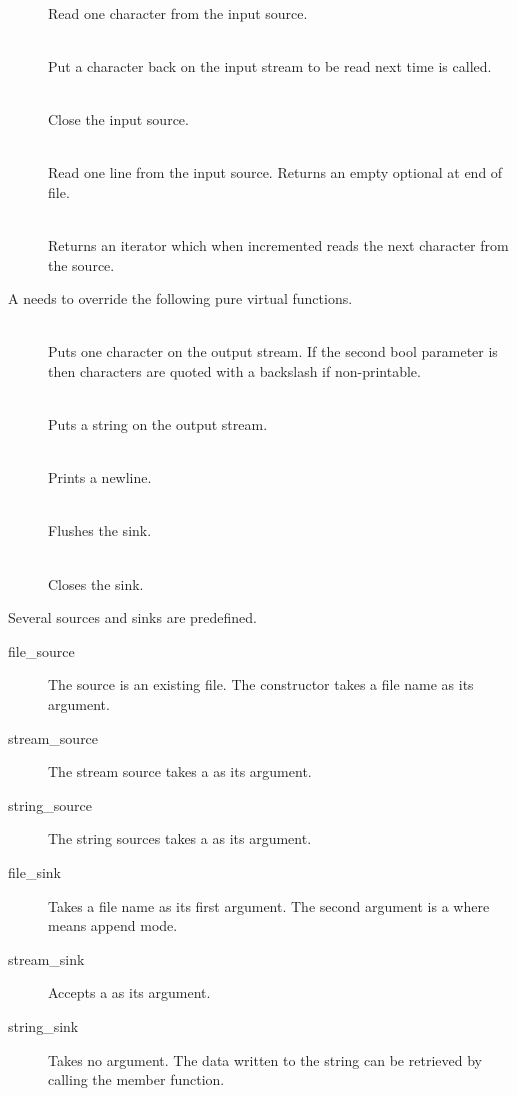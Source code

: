 \begin{description}
  \item[]  \\ Read one character from the input source.
  \item[]  \\ Put a character back on the input
    stream to be read next time  is called.
  \item[]  \\ Close the input source.
  \item[]  \\ Read one line
    from the input source. Returns an empty optional at end of file.
  \item[]  \\ Returns an iterator which when
    incremented reads the next character from the source.
\end{description}

A  needs to override the following pure virtual functions.

\begin{description}
  \item[]  \\ Puts one character on
    the output stream. If the second bool parameter is  then
    characters are quoted with a backslash if non-printable.
  \item[]  \\ Puts a
    string on the output stream.
  \item[]  \\ Prints a newline.
  \item[]  \\ Flushes the sink.
  \item[]  \\ Closes the sink.
\end{description}

Several sources and sinks are predefined.

\begin{description}
  \item[file\_source] The source is an existing file. The constructor
    takes a file name as its argument.
  \item[stream\_source] The stream source takes a 
    as its argument.
  \item[string\_source] The string sources takes a 
    as its argument.
  \item[file\_sink] Takes a file name as its first argument. The
    second argument is a  where  means append
    mode.
  \item[stream\_sink] Accepts a  as its argument.
  \item[string\_sink] Takes no argument. The data written to the
    string can be retrieved by calling the
     member function.
\end{description}

